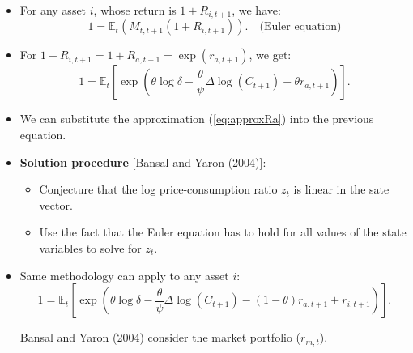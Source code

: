 \begin{frame}{}
\begin{footnotesize}
\begin{itemize}
	\item For any asset $i$, whose return is $1+R_{i,t+1}$, we have:
	\begin{equation}\label{eq:Euler}
	1 = \mathbb{E}_t(M_{t,t+1}(1+R_{i,t+1})). \quad \mbox{(Euler equation)}
	\end{equation}
	\item For $1+R_{i,t+1} = 1+R_{a,t+1} = \exp(r_{a,t+1})$, we get:
	\begin{equation}\label{eq:sdfRa}
	1 = \mathbb{E}_t \left[ \exp\left(\theta \log \delta - \frac{\theta}{\psi} \Delta \log(C_{t+1}) + \theta r_{a,t+1} \right) \right].
	\end{equation}
	\item We can substitute the approximation (\ref{eq:approxRa}) into the previous equation.
	\item {\bf Solution procedure} [\href{http://onlinelibrary.wiley.com/doi/10.1111/j.1540-6261.2004.00670.x/abstract}{Bansal and Yaron (2004)}]:
	\begin{itemize}
		\item \begin{scriptsize}Conjecture that the log price-consumption ratio $z_t$ is linear in the sate vector.\end{scriptsize}
		\item \begin{scriptsize}Use the fact that the Euler equation has to hold for all values of the state variables to solve for $z_t$.\end{scriptsize}
	\end{itemize}
	\item Same methodology can apply to any asset $i$:
	\begin{equation}\label{eq:sdfRi}
	1 = \mathbb{E}_t \left[ \exp\left(\theta \log \delta - \frac{\theta}{\psi} \Delta \log(C_{t+1}) - (1 - \theta) r_{a,t+1} + r_{i,t+1} \right) \right].
	\end{equation}
	
	Bansal and Yaron (2004) consider the market portfolio ($r_{m,t}$).
\end{itemize}
\end{footnotesize}
\end{frame}



